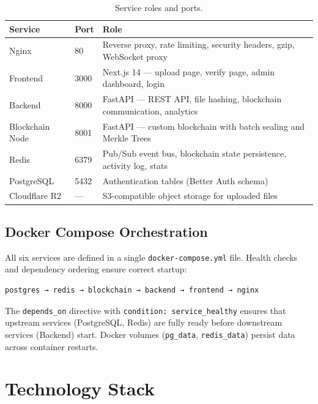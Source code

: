 \documentclass[12pt, a4paper]{report}
\begin{document}
\begin{table}[H]
\centering
\begin{tabularx}{\textwidth}{l l X}
\toprule
\textbf{Service} & \textbf{Port} & \textbf{Role} \\
\midrule
Nginx & 80 & Reverse proxy, rate limiting, security headers, gzip, WebSocket proxy \\
Frontend & 3000 & Next.js 14 — upload page, verify page, admin dashboard, login \\
Backend & 8000 & FastAPI — REST API, file hashing, blockchain communication, analytics \\
Blockchain Node & 8001 & FastAPI — custom blockchain with batch sealing and Merkle Trees \\
Redis & 6379 & Pub/Sub event bus, blockchain state persistence, activity log, stats \\
PostgreSQL & 5432 & Authentication tables (Better Auth schema) \\
Cloudflare R2 & — & S3-compatible object storage for uploaded files \\
\bottomrule
\end{tabularx}
\caption{Service roles and ports.}
\end{table}

\section{Docker Compose Orchestration}

All six services are defined in a single \texttt{docker-compose.yml} file.
Health checks and dependency ordering ensure correct startup:

\begin{verbatim}
postgres → redis → blockchain → backend → frontend → nginx
\end{verbatim}

The \texttt{depends\_on} directive with \texttt{condition: service\_healthy}
ensures that upstream services (PostgreSQL, Redis) are fully ready before
downstream services (Backend) start. Docker volumes (\texttt{pg\_data},
\texttt{redis\_data}) persist data across container restarts.


\chapter{Technology Stack}
\end{document}
